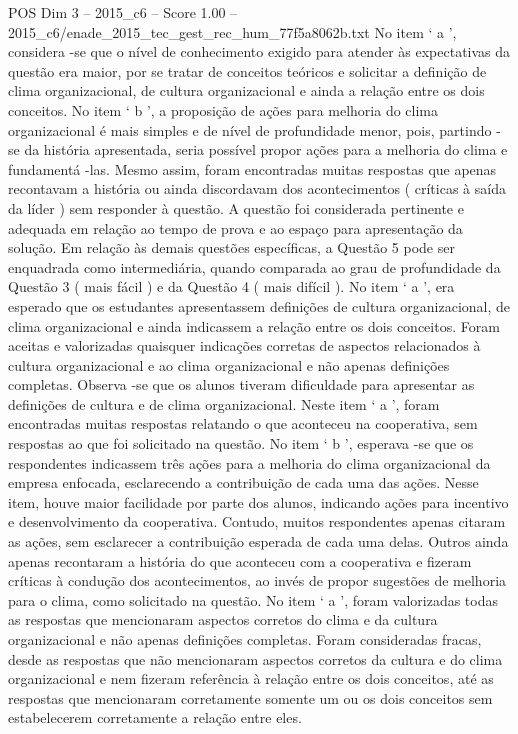 \begin{textsample}{POS Dim 3 – 2015\_c6 – Score 1.00 – 2015\_c6/enade\_2015\_tec\_gest\_rec\_hum\_77f5a8062b.txt}
No item ‘ a ’, considera -se que o nível de conhecimento exigido para atender às expectativas da questão era maior, por se tratar de conceitos teóricos e solicitar a definição de clima organizacional, de cultura organizacional e ainda a relação entre os dois conceitos.
No item ‘ b ’, a proposição de ações para melhoria do clima organizacional é mais simples e de nível de profundidade menor, pois, partindo -se da história apresentada, seria possível propor ações para a melhoria do clima e fundamentá -las.
Mesmo assim, foram encontradas muitas respostas que apenas recontavam a história ou ainda discordavam dos acontecimentos ( críticas à saída da líder ) sem responder à questão.
A questão foi considerada pertinente e adequada em relação ao tempo de prova e ao espaço para apresentação da solução.
Em relação às demais questões específicas, a Questão 5 pode ser enquadrada como intermediária, quando comparada ao grau de profundidade da Questão 3 ( mais fácil ) e da Questão 4 ( mais difícil ).
No item ‘ a ’, era esperado que os estudantes apresentassem definições de cultura organizacional, de clima organizacional e ainda indicassem a relação entre os dois conceitos.
Foram aceitas e valorizadas quaisquer indicações corretas de aspectos relacionados à cultura organizacional e ao clima organizacional e não apenas definições completas.
Observa -se que os alunos tiveram dificuldade para apresentar as definições de cultura e de clima organizacional.
Neste item ‘ a ’, foram encontradas muitas respostas relatando o que aconteceu na cooperativa, sem respostas ao que foi solicitado na questão.
No item ‘ b ’, esperava -se que os respondentes indicassem três ações para a melhoria do clima organizacional da empresa enfocada, esclarecendo a contribuição de cada uma das ações.
Nesse item, houve maior facilidade por parte dos alunos, indicando ações para incentivo e desenvolvimento da cooperativa.
Contudo, muitos respondentes apenas citaram as ações, sem esclarecer a contribuição esperada de cada uma delas.
Outros ainda apenas recontaram a história do que aconteceu com a cooperativa e fizeram críticas à condução dos acontecimentos, ao invés de propor sugestões de melhoria para o clima, como solicitado na questão.
No item ‘ a ’, foram valorizadas todas as respostas que mencionaram aspectos corretos do clima e da cultura organizacional e não apenas definições completas.
Foram consideradas fracas, desde as respostas que não mencionaram aspectos corretos da cultura e do clima organizacional e nem fizeram referência à relação entre os dois conceitos, até as respostas que mencionaram corretamente somente um ou os dois conceitos sem estabelecerem corretamente a relação entre eles.

\end{textsample}
